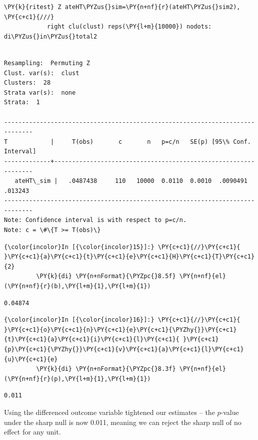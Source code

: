 \documentclass[11pt,notitlepage]{article}\usepackage[]{graphicx}\usepackage[]{color}
\makeatletter
\newenvironment{kframe}{%
 \def\at@end@of@kframe{}%
 \ifinner\ifhmode%
  \def\at@end@of@kframe{\end{minipage}}%
  \begin{minipage}{\columnwidth}%
 \fi\fi%
 \def\FrameCommand##1{\hskip\@totalleftmargin \hskip-\fboxsep
 \colorbox{shadecolor}{##1}\hskip-\fboxsep
     \hskip-\linewidth \hskip-\@totalleftmargin \hskip\columnwidth}%
 \MakeFramed {\advance\hsize-\width
   \@totalleftmargin\z@ \linewidth\hsize
   \@setminipage}}%
 {\par\unskip\endMakeFramed%
 \at@end@of@kframe}
\newenvironment{knitrout}{}{} %
\makeatother
\begin{document}
\begin{enumerate}[a)]
\begin{knitrout}
\begin{kframe}
\begin{Verbatim}[commandchars=\\\{\}]
         \PY{k}{ritest} Z ateHT\PYZus{}sim=\PY{n+nf}{r}(ateHT\PYZus{}sim2), \PY{c+c1}{///}
         	right clu(clust) reps(\PY{l+m}{10000}) nodots: di\PYZus{}in\PYZus{}total2
\end{Verbatim}

    \begin{Verbatim}[commandchars=\\\{\}]

Resampling:  Permuting Z
Clust. var(s):  clust
Clusters:  28
Strata var(s):  none
Strata:  1

------------------------------------------------------------------------------
T            |     T(obs)       c       n   p=c/n   SE(p) [95\% Conf. Interval]
-------------+----------------------------------------------------------------
   ateHT\_sim |   .0487438     110   10000  0.0110  0.0010  .0090491    .013243
------------------------------------------------------------------------------
Note: Confidence interval is with respect to p=c/n.
Note: c = \#\{T >= T(obs)\}

    \end{Verbatim}

    \begin{Verbatim}[commandchars=\\\{\}]
{\color{incolor}In [{\color{incolor}15}]:} \PY{c+c1}{//}\PY{c+c1}{ }\PY{c+c1}{a}\PY{c+c1}{t}\PY{c+c1}{e}\PY{c+c1}{H}\PY{c+c1}{T}\PY{c+c1}{2}
         \PY{k}{di} \PY{n+nFormat}{\PYZpc{}8.5f} \PY{n+nf}{el}(\PY{n+nf}{r}(b),\PY{l+m}{1},\PY{l+m}{1})
\end{Verbatim}

    \begin{Verbatim}[commandchars=\\\{\}]
 0.04874
    \end{Verbatim}

    \begin{Verbatim}[commandchars=\\\{\}]
{\color{incolor}In [{\color{incolor}16}]:} \PY{c+c1}{//}\PY{c+c1}{ }\PY{c+c1}{o}\PY{c+c1}{n}\PY{c+c1}{e}\PY{c+c1}{\PYZhy{}}\PY{c+c1}{t}\PY{c+c1}{a}\PY{c+c1}{i}\PY{c+c1}{l}\PY{c+c1}{ }\PY{c+c1}{p}\PY{c+c1}{\PYZhy{}}\PY{c+c1}{v}\PY{c+c1}{a}\PY{c+c1}{l}\PY{c+c1}{u}\PY{c+c1}{e}
         \PY{k}{di} \PY{n+nFormat}{\PYZpc{}8.3f} \PY{n+nf}{el}(\PY{n+nf}{r}(p),\PY{l+m}{1},\PY{l+m}{1})
\end{Verbatim}

    \begin{Verbatim}[commandchars=\\\{\}]
   0.011
    \end{Verbatim}
\end{kframe}
\end{knitrout}

Using the differenced outcome variable tightened our estimates -- the $p$-value under the sharp null is now 0.011, meaning we can reject the sharp null of no effect for any unit.

\end{enumerate}
\end{document}
